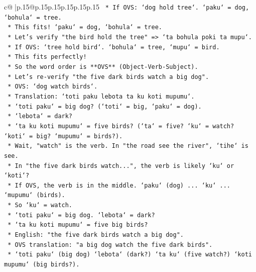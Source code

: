\documentclass{article}
\begin{document}
{\begin{supertabular}{c@{$\;$}|p{.15\linewidth}@{}p{.15\linewidth}p{.15\linewidth}p{.15\linewidth}p{.15\linewidth}p{.15\linewidth}}
{{{\texttt{                *   If OVS: `dog hold tree`. `paku` = dog, `bohula` = tree.} \\
\texttt{                *   This fits! `paku` = dog, `bohula` = tree.} \\
\texttt{                *   Let's verify "the bird hold the tree" => `ta bohula poki ta mupu`.} \\
\texttt{                *   If OVS: `tree hold bird`. `bohula` = tree, `mupu` = bird.} \\
\texttt{                *   This fits perfectly!} \\
\texttt{                *   So the word order is **OVS** (Object{-}Verb{-}Subject).} \\
\texttt{                *   Let's re{-}verify "the five dark birds watch a big dog".} \\
\texttt{                *   OVS: `dog watch birds`.} \\
\texttt{                *   Translation: `toti paku lebota ta ku koti mupumu`.} \\
\texttt{                *   `toti paku` = big dog? (`toti` = big, `paku` = dog).} \\
\texttt{                *   `lebota` = dark?} \\
\texttt{                *   `ta ku koti mupumu` = five birds? (`ta` = five? `ku` = watch? `koti` = big? `mupumu` = birds?).} \\
\texttt{                *   Wait, "watch" is the verb. In "the road see the river", `tihe` is see.} \\
\texttt{                *   In "the five dark birds watch...", the verb is likely `ku` or `koti`?} \\
\texttt{                *   If OVS, the verb is in the middle. `paku` (dog) ... `ku` ... `mupumu` (birds).} \\
\texttt{                *   So `ku` = watch.} \\
\texttt{                *   `toti paku` = big dog. `lebota` = dark?} \\
\texttt{                *   `ta ku koti mupumu` = five big birds?} \\
\texttt{                *   English: "the five dark birds watch a big dog".} \\
\texttt{                *   OVS translation: "a big dog watch the five dark birds".} \\
\texttt{                *   `toti paku` (big dog) `lebota` (dark?) `ta ku` (five watch?) `koti mupumu` (big birds?).} \\
}}}
\end{supertabular}}
\end{document}
